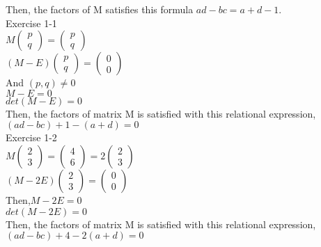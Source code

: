 \documentclass[11pt, oneside]{article}   	%
\begin{document}
Then, the factors of M satisfies this formula $ad-bc= a+d -1$.\\

Exercise 1-1\\

$ M 
\begin{pmatrix}
 p\\
 q
\end{pmatrix}
=
\begin{pmatrix}
 p\\
 q
\end{pmatrix}$\\
$(M- E)
\begin{pmatrix}
 p\\
 q
\end{pmatrix}
=
\begin{pmatrix}
 0\\
 0
\end{pmatrix}
$\\
And $(p,q) \neq 0$\\
$M-E = 0$\\
$det (M-E) = 0$\\
Then, the factors of matrix M is satisfied with this  relational expression,\\  $(ad-bc)+1-(a+d)=0$\\

Exercise 1-2\\

$ M 
\begin{pmatrix}
 2\\
 3
\end{pmatrix}
=
\begin{pmatrix}
 4\\
 6
\end{pmatrix}
 =
2
\begin{pmatrix}
 2\\
 3
\end{pmatrix}\
$\\

$(M- 2E)
\begin{pmatrix}
 2\\
 3
\end{pmatrix}
=
\begin{pmatrix}
 0\\
 0
\end{pmatrix}
$\\
Then,$M-2E = 0$\\
$det (M-2E) = 0$\\
Then, the factors of matrix M is satisfied with this  relational expression, \\ $(ad-bc)+4-2(a+d)=0$\\
\end{document}

